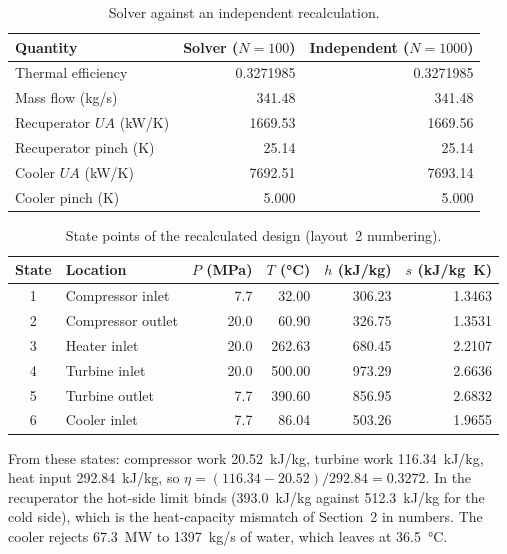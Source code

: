 \begin{table}[!htbp]\centering\small
\begin{tabular}{lrr}
\toprule
Quantity & Solver ($N=100$) & Independent ($N=1000$)\\
\midrule
Thermal efficiency & 0.3271985 & 0.3271985\\
Mass flow (\si{kg/s}) & 341.48 & 341.48\\
Recuperator $UA$ (\si{kW/K}) & 1669.53 & 1669.56\\
Recuperator pinch (\si{K}) & 25.14 & 25.14\\
Cooler $UA$ (\si{kW/K}) & 7692.51 & 7693.14\\
Cooler pinch (\si{K}) & 5.000 & 5.000\\
\bottomrule
\end{tabular}
\caption{Solver against an independent recalculation.}\label{tab:indep}
\end{table}

\begin{table}[!htbp]\centering\small
\begin{tabular}{clrrrr}
\toprule
State & Location & $P$ (\si{MPa}) & $T$ (\si{\celsius}) & $h$ (\si{kJ/kg}) & $s$ (\si{kJ/kg.K})\\
\midrule
1 & Compressor inlet & 7.7 & 32.00 & 306.23 & 1.3463\\
2 & Compressor outlet & 20.0 & 60.90 & 326.75 & 1.3531\\
3 & Heater inlet & 20.0 & 262.63 & 680.45 & 2.2107\\
4 & Turbine inlet & 20.0 & 500.00 & 973.29 & 2.6636\\
5 & Turbine outlet & 7.7 & 390.60 & 856.95 & 2.6832\\
6 & Cooler inlet & 7.7 & 86.04 & 503.26 & 1.9655\\
\bottomrule
\end{tabular}
\caption{State points of the recalculated design (layout~2 numbering).}\label{tab:states}
\end{table}

From these states: compressor work \SI{20.52}{kJ/kg}, turbine work \SI{116.34}{kJ/kg}, heat input \SI{292.84}{kJ/kg}, so $\eta = (116.34 - 20.52)/292.84 = 0.3272$. In the recuperator the hot-side limit binds (\SI{393.0}{kJ/kg} against \SI{512.3}{kJ/kg} for the cold side), which is the heat-capacity mismatch of Section~2 in numbers. The cooler rejects \SI{67.3}{MW} to \SI{1397}{kg/s} of water, which leaves at \SI{36.5}{\celsius}.

